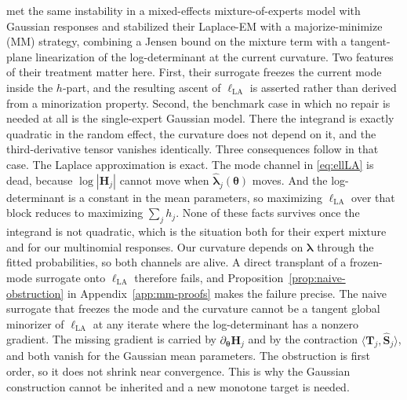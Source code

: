 
\citet{Yue2026} met the same instability in a mixed-effects mixture-of-experts model with Gaussian responses and stabilized their Laplace-EM with a majorize-minimize (MM) strategy, combining a Jensen bound on the mixture term with a tangent-plane linearization of the log-determinant at the current curvature. Two features of their treatment matter here. First, their surrogate freezes the current mode inside the $h$-part, and the resulting ascent of $\ell_{\text{LA}}$ is asserted rather than derived from a minorization property. Second, the benchmark case in which no repair is needed at all is the single-expert Gaussian model. There the integrand is exactly quadratic in the random effect, the curvature does not depend on it, and the third-derivative tensor vanishes identically. Three consequences follow in that case. The Laplace approximation is exact. The mode channel in \eqref{eq:ellLA} is dead, because $\log|\mathbf{H}_{j}|$ cannot move when $\hat{\bm{\lambda}}_{j}(\bm{\theta})$ moves. And the log-determinant is a constant in the mean parameters, so maximizing $\ell_{\text{LA}}$ over that block reduces to maximizing $\sum_{j}h_{j}$. None of these facts survives once the integrand is not quadratic, which is the situation both for their expert mixture and for our multinomial responses. Our curvature depends on $\bm{\lambda}$ through the fitted probabilities, so both channels are alive. A direct transplant of a frozen-mode surrogate onto $\ell_{\text{LA}}$ therefore fails, and Proposition~\ref{prop:naive-obstruction} in Appendix~\ref{app:mm-proofs} makes the failure precise. The naive surrogate that freezes the mode and the curvature cannot be a tangent global minorizer of $\ell_{\text{LA}}$ at any iterate where the log-determinant has a nonzero gradient. The missing gradient is carried by $\partial_{\bm{\theta}}\mathbf{H}_{j}$ and by the contraction $\big\langle\mathbf{T}_{j},\hat{\mathbf{S}}_{j}\big\rangle$, and both vanish for the Gaussian mean parameters. The obstruction is first order, so it does not shrink near convergence. This is why the Gaussian construction cannot be inherited and a new monotone target is needed.



